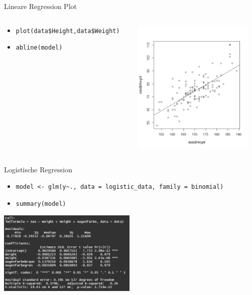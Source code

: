 \documentclass[aspectratio = 169]{chariteBeamer}
\begin{document}
\begin{frame}[fragile]{Lineare Regression Plot}
	\begin{columns}[T]
		\begin{column}{0.6\textwidth}
			\begin{itemize}
				\item \verb+plot(data$Height,data$Weight)+
				\item \verb+abline(model)+
			\end{itemize}
		\end{column}
		\begin{column}{0.4\textwidth}
			\includegraphics[height=6.5cm]{LinearRegressionPlot}
		\end{column}
	\end{columns}
\end{frame}

\begin{frame}[fragile]{Logistische Regression}
	\begin{itemize}
		\item \verb+model <- glm(y~., data = logistic_data, family = binomial)+
		\item \verb+summary(model)+
	\end{itemize}
			
	\begin{center}
		\includegraphics[height=4cm]{LogisticRegressionSummary}
	\end{center}
\end{frame}
\end{document}
